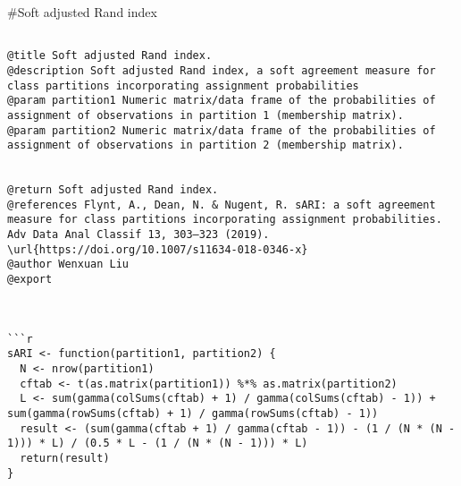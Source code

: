 \documentclass[
]{article}
\begin{document}
\#Soft adjusted Rand index

\begin{verbatim}

@title Soft adjusted Rand index.
@description Soft adjusted Rand index, a soft agreement measure for class partitions incorporating assignment probabilities
@param partition1 Numeric matrix/data frame of the probabilities of assignment of observations in partition 1 (membership matrix).
@param partition2 Numeric matrix/data frame of the probabilities of assignment of observations in partition 2 (membership matrix).


@return Soft adjusted Rand index.
@references Flynt, A., Dean, N. & Nugent, R. sARI: a soft agreement measure for class partitions incorporating assignment probabilities. Adv Data Anal Classif 13, 303–323 (2019). \url{https://doi.org/10.1007/s11634-018-0346-x}
@author Wenxuan Liu
@export



```r
sARI <- function(partition1, partition2) {
  N <- nrow(partition1)
  cftab <- t(as.matrix(partition1)) %*% as.matrix(partition2)
  L <- sum(gamma(colSums(cftab) + 1) / gamma(colSums(cftab) - 1)) + sum(gamma(rowSums(cftab) + 1) / gamma(rowSums(cftab) - 1))
  result <- (sum(gamma(cftab + 1) / gamma(cftab - 1)) - (1 / (N * (N - 1))) * L) / (0.5 * L - (1 / (N * (N - 1))) * L)
  return(result)
}
\end{verbatim}
\end{document}
